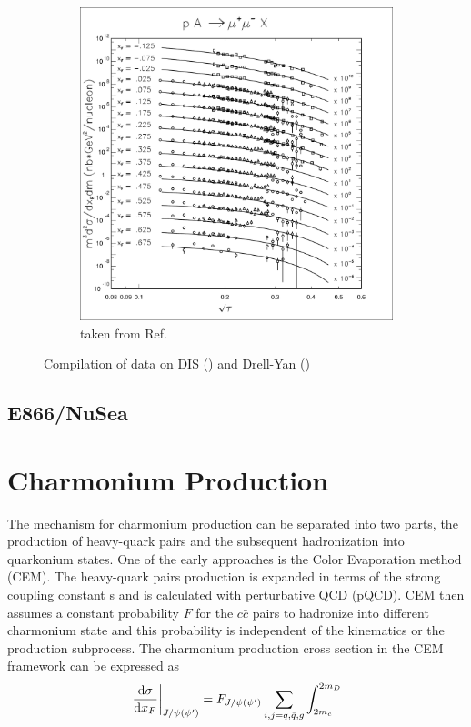 \begin{figure}
\begin{subfigure}{0.45\linewidth}
		\includegraphics[width=\linewidth]{images/DY_scaling}
		\caption{taken from Ref.\ \cite{mcgaughey1999}}
		\label{subfig:DY_scaling}
	\end{subfigure}
	\caption{Compilation of data on DIS () and 
		Drell-Yan ()}
\end{figure}


\subsection{E866/NuSea}
\label{sec:E866}

\section{Charmonium Production}
\label{sec:jpsi}
The mechanism for charmonium production can be separated into two parts, the 
production of heavy-quark pairs and the subsequent hadronization into 
quarkonium states. One of the early approaches is the Color Evaporation method 
(CEM)\cite{einhorn1975,bodwin1995,bodwin1997}. The heavy-quark pairs production
is expanded in terms of the strong coupling constant s and is calculated with 
perturbative QCD (pQCD). CEM then assumes a constant probability $F$ for the 
$c\bar{c}$ pairs to hadronize into different charmonium state and this 
probability is independent of the kinematics or the production subprocess. The 
charmonium production cross section in the CEM framework can be expressed as
\begin{equation}
\eval{\dv{\sigma}{x_{F}}}_{J/\psi\left(\psi^\prime\right)} =
	F_{J/\psi\left(\psi^\prime\right)} \sum_{i,j=q,\bar{q},g} \int_{2m_c}^{2m_D}
\end{equation}




